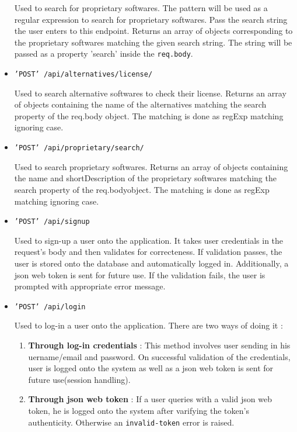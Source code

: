 \begin{itemize}
Used to search for proprietary softwares. The pattern will be used as a regular expression to search for proprietary softwares. Pass the search string the user enters to this endpoint. Returns an array of objects corresponding to the proprietary softwares matching the given search string. The string will be passed as a property 'search' inside the \texttt{req.body}.


\item{\texttt{'POST' /api/alternatives/license/}}

Used to search alternative softwares to check their license. Returns an array of objects containing the name of the alternatives matching the search property of the req.body object. The matching is done as regExp matching ignoring case.


\item{\texttt{'POST' /api/proprietary/search/}}

Used to search proprietary softwares. Returns an array of objects containing the name and shortDescription of the proprietary softwares matching the search property of the req.bodyobject. The matching is done as regExp matching ignoring case.


\item{\texttt{'POST' /api/signup}}

Used to sign-up a user onto the application. It takes user credentials in the request's body and then validates for correcteness. If validation passes, the user is stored onto the database and automatically logged in. Additionally, a json web token is sent for future use. If the validation fails, the user is prompted with appropriate error message.


\item{\texttt{'POST' /api/login}}

Used to log-in a user onto the application. There are two ways of doing it : 

\begin{enumerate}
\item \textbf{Through log-in credentials} : This method involves user sending in his uername/email and password. On successful validation of the credentials, user is logged onto the system as well as a json web token is sent for future use(session handling).

\item \textbf{Through json web token} : If a user queries with a valid json web token, he is logged onto the system after varifying the token's authenticity. Otherwise an \texttt{invalid-token} error is raised.
\end{enumerate}

\end{itemize}



